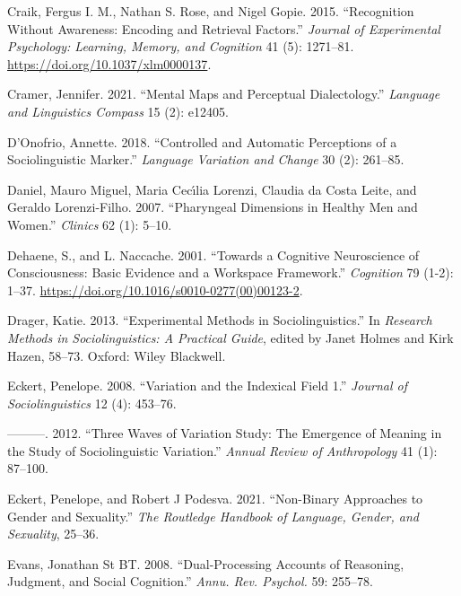 \documentclass[
  letterpaper,
  DIV=11,
  numbers=noendperiod]{scrartcl}
\newlength{\cslhangindent}
\newenvironment{CSLReferences}[2] %
 {\begin{list}{}{%
  \setlength{\itemindent}{0pt}
  \setlength{\leftmargin}{0pt}
  \setlength{\parsep}{0pt}
  \ifodd #1
   \setlength{\leftmargin}{\cslhangindent}
   \setlength{\itemindent}{-1\cslhangindent}
  \fi
  \setlength{\itemsep}{#2\baselineskip}}}
 {\end{list}}
\begin{document}
\begin{CSLReferences}{1}{0}
Craik, Fergus I. M., Nathan S. Rose, and Nigel Gopie. 2015.
{``Recognition Without Awareness: {Encoding} and Retrieval Factors.''}
\emph{Journal of Experimental Psychology: Learning, Memory, and
Cognition} 41 (5): 1271--81. \url{https://doi.org/10.1037/xlm0000137}.

Cramer, Jennifer. 2021. {``Mental Maps and Perceptual Dialectology.''}
\emph{Language and Linguistics Compass} 15 (2): e12405.

D'Onofrio, Annette. 2018. {``Controlled and Automatic Perceptions of a
Sociolinguistic Marker.''} \emph{Language Variation and Change} 30 (2):
261--85.

Daniel, Mauro Miguel, Maria Cecı́lia Lorenzi, Claudia da Costa Leite, and
Geraldo Lorenzi-Filho. 2007. {``Pharyngeal Dimensions in Healthy Men and
Women.''} \emph{Clinics} 62 (1): 5--10.

Dehaene, S., and L. Naccache. 2001. {``Towards a Cognitive Neuroscience
of Consciousness: Basic Evidence and a Workspace Framework.''}
\emph{Cognition} 79 (1-2): 1--37.
\url{https://doi.org/10.1016/s0010-0277(00)00123-2}.

Drager, Katie. 2013. {``Experimental Methods in Sociolinguistics.''} In
\emph{Research Methods in Sociolinguistics: A Practical Guide}, edited
by Janet Holmes and Kirk Hazen, 58--73. Oxford: Wiley Blackwell.

Eckert, Penelope. 2008. {``Variation and the Indexical Field 1.''}
\emph{Journal of Sociolinguistics} 12 (4): 453--76.

---------. 2012. {``Three Waves of Variation Study: {The} Emergence of
Meaning in the Study of Sociolinguistic Variation.''} \emph{Annual
Review of Anthropology} 41 (1): 87--100.

Eckert, Penelope, and Robert J Podesva. 2021. {``Non-Binary Approaches
to Gender and Sexuality.''} \emph{The Routledge Handbook of Language,
Gender, and Sexuality}, 25--36.

Evans, Jonathan St BT. 2008. {``Dual-Processing Accounts of Reasoning,
Judgment, and Social Cognition.''} \emph{Annu. Rev. Psychol.} 59:
255--78.


\end{CSLReferences}
\end{document}
